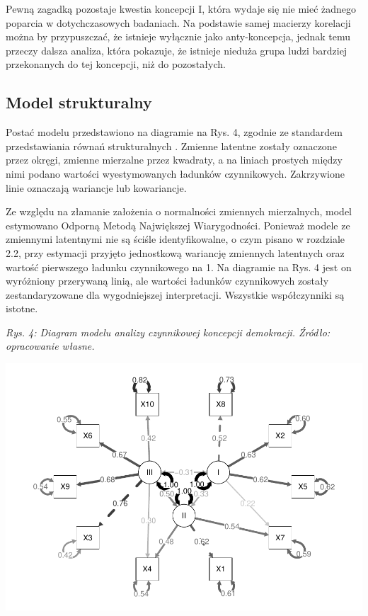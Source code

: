 \documentclass[12pt]{article}
\begin{document}
Pewną zagadką pozostaje kwestia koncepcji I, która wydaje się nie mieć żadnego poparcia w dotychczasowych badaniach. Na podstawie samej macierzy korelacji można by przypuszczać, że istnieje wyłącznie jako anty-koncepcja, jednak temu przeczy dalsza analiza, która pokazuje, że istnieje nieduża grupa ludzi bardziej przekonanych do tej koncepcji, niż do pozostałych.

\hypertarget{model-strukturalny}{%
\subsection{Model strukturalny}\label{model-strukturalny}}

Postać modelu przedstawiono na diagramie na Rys. 4, zgodnie ze standardem przedstawiania równań strukturalnych \citep{Everitt}. Zmienne latentne zostały oznaczone przez okręgi, zmienne mierzalne przez kwadraty, a na liniach prostych między nimi podano wartości wyestymowanych ładunków czynnikowych. Zakrzywione linie oznaczają wariancje lub kowariancje.

Ze względu na złamanie założenia o normalności zmiennych mierzalnych, model estymowano Odporną Metodą Największej Wiarygodności. Ponieważ modele ze zmiennymi latentnymi nie są ściśle identyfikowalne, o czym pisano w rozdziale 2.2, przy estymacji przyjęto jednostkową wariancję zmiennych latentnych oraz wartość pierwszego ładunku czynnikowego na 1. Na diagramie na Rys. 4 jest on wyróżniony przerywaną linią, ale wartości ładunków czynnikowych zostały zestandaryzowane dla wygodniejszej interpretacji. Wszystkie współczynniki są istotne.

\emph{Rys. 4: Diagram modelu analizy czynnikowej koncepcji demokracji. Źródło: opracowanie własne.}

\begin{center}\includegraphics{text_ASA_files/figure-latex/diagram-all-1} \end{center}
\end{document}
